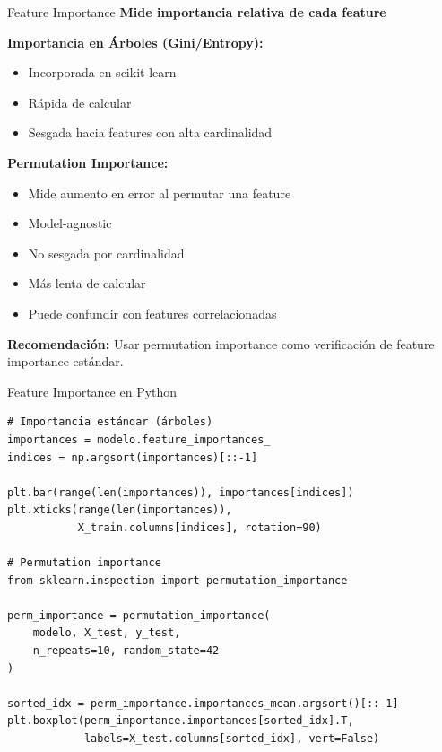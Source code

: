 \documentclass[aspectratio=169]{beamer}
\begin{document}
\begin{frame}{Feature Importance}
\textbf{Mide importancia relativa de cada feature}

\vspace{0.3cm}

\textbf{Importancia en Árboles (Gini/Entropy):}
\begin{itemize}
\item Incorporada en scikit-learn
\item Rápida de calcular
\item Sesgada hacia features con alta cardinalidad
\end{itemize}

\vspace{0.3cm}

\textbf{Permutation Importance:}
\begin{itemize}
\item Mide aumento en error al permutar una feature
\item Model-agnostic
\item No sesgada por cardinalidad
\item Más lenta de calcular
\item Puede confundir con features correlacionadas
\end{itemize}

\vspace{0.3cm}

\textbf{Recomendación:} Usar permutation importance como verificación de feature importance estándar.
\end{frame}

\begin{frame}[fragile]{Feature Importance en Python}
\small
\begin{verbatim}
# Importancia estándar (árboles)
importances = modelo.feature_importances_
indices = np.argsort(importances)[::-1]

plt.bar(range(len(importances)), importances[indices])
plt.xticks(range(len(importances)), 
           X_train.columns[indices], rotation=90)

# Permutation importance
from sklearn.inspection import permutation_importance

perm_importance = permutation_importance(
    modelo, X_test, y_test,
    n_repeats=10, random_state=42
)

sorted_idx = perm_importance.importances_mean.argsort()[::-1]
plt.boxplot(perm_importance.importances[sorted_idx].T,
            labels=X_test.columns[sorted_idx], vert=False)
\end{verbatim}
\end{frame}
\end{document}
